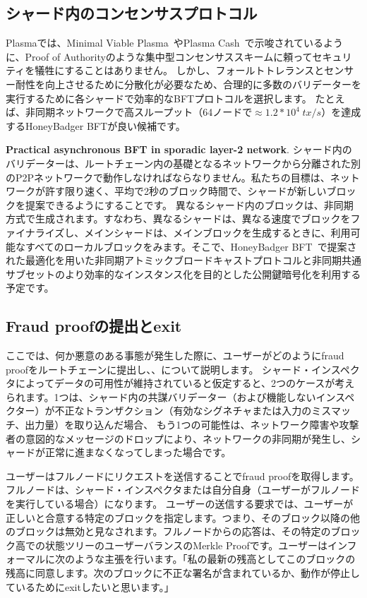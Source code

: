 \subsection{シャード内のコンセンサスプロトコル}\label{shard-consensus}
Plasmaでは、Minimal Viable Plasma~\cite{plasma-mvp}やPlasma Cash~\cite{plasma-cash}で示唆されているように、Proof of Authorityのような集中型コンセンサススキームに頼ってセキュリティを犠牲にすることはありません。 しかし、フォールトトレランスとセンサー耐性を向上させるために分散化が必要なため、合理的に多数のバリデーターを実行するために各シャードで効率的なBFTプロトコルを選択します。 たとえば、非同期ネットワークで高スループット（64ノードで$\approx 1.2*10^4\hspace{3pt} tx/s$）を達成するHoneyBadger BFT\cite{honeybadger}が良い候補です。

\textbf{Practical asynchronous BFT in sporadic layer-2 network}.
シャード内のバリデーターは、ルートチェーン内の基礎となるネットワークから分離された別のP2Pネットワークで動作しなければならなりません。私たちの目標は、ネットワークが許す限り速く、平均で2秒のブロック時間で、シャードが新しいブロックを提案できるようにすることです。 異なるシャード内のブロックは、非同期方式で生成されます。すなわち、異なるシャードは、異なる速度でブロックをファイナライズし、メインシャードは、メインブロックを生成するときに、利用可能なすべてのローカルブロックをみます。そこで、HoneyBadger BFT~\cite{honeybadger}で提案された最適化を用いた非同期アトミックブロードキャストプロトコルと非同期共通サブセットのより効率的なインスタンス化を目的とした公開鍵暗号化を利用する予定です。

\subsection{Fraud proofの提出とexit}
ここでは、何か悪意のある事態が発生した際に、ユーザーがどのようにfraud proofをルートチェーンに提出し、、について説明します。 シャード・インスペクタによってデータの可用性が維持されていると仮定すると、2つのケースが考えられます。1つは、シャード内の共謀バリデーター（および機能しないインスペクター）が不正なトランザクション（有効なシグネチャまたは入力のミスマッチ、出力量）を取り込んだ場合、 もう1つの可能性は、ネットワーク障害や攻撃者の意図的なメッセージのドロップにより、ネットワークの非同期が発生し、シャードが正常に進まなくなってしまった場合です。

ユーザーはフルノードにリクエストを送信することでfraud proofを取得します。フルノードは、シャード・インスペクタまたは自分自身（ユーザーがフルノードを実行している場合）になります。 ユーザーの送信する要求では、ユーザーが正しいと合意する特定のブロックを指定します。つまり、そのブロック以降の他のブロックは無効と見なされます。フルノードからの応答は、その特定のブロック高での状態ツリーのユーザーバランスのMerkle Proofです。ユーザーはインフォーマルに次のような主張を行います。「私の最新の残高としてこのブロックの残高に同意します。次のブロックに不正な署名が含まれているか、動作が停止しているためにexitしたいと思います。」

